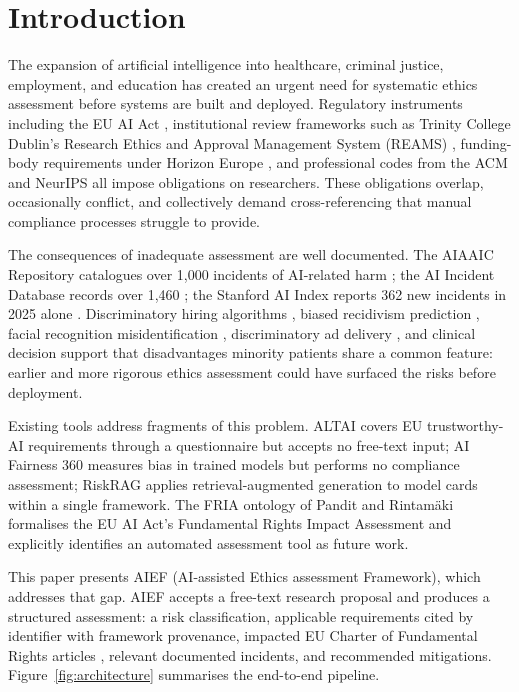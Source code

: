 \documentclass[a4paper,oneside,12pt]{book}
\numberwithin{equation}{chapter}
\begin{document}
\chapter{Introduction}
\label{ch:introduction}

The expansion of artificial intelligence into healthcare, criminal justice, employment, and education has created an urgent need for systematic ethics assessment before systems are built and deployed. Regulatory instruments including the EU AI Act \cite{euaiact2024}, institutional review frameworks such as Trinity College Dublin's Research Ethics and Approval Management System (REAMS) \cite{reams2023}, funding-body requirements under Horizon Europe \cite{horizonethics2021}, and professional codes from the ACM \cite{acmethics2018} and NeurIPS \cite{neurips2021} all impose obligations on researchers. These obligations overlap, occasionally conflict, and collectively demand cross-referencing that manual compliance processes struggle to provide.

The consequences of inadequate assessment are well documented. The AIAAIC Repository catalogues over 1,000 incidents of AI-related harm \cite{aiaaic2024}; the AI Incident Database records over 1,460 \cite{aiid2024}; the Stanford AI Index reports 362 new incidents in 2025 alone \cite{stanfordaiindex2026}. Discriminatory hiring algorithms \cite{amazonhiring2018}, biased recidivism prediction \cite{compas2016}, facial recognition misidentification \cite{rekognition2019}, discriminatory ad delivery \cite{facebookads2019}, and clinical decision support that disadvantages minority patients \cite{optum2019} share a common feature: earlier and more rigorous ethics assessment could have surfaced the risks before deployment.

Existing tools address fragments of this problem. ALTAI \cite{altai2020} covers EU trustworthy-AI requirements through a questionnaire but accepts no free-text input; AI Fairness 360 \cite{aif360} measures bias in trained models but performs no compliance assessment; RiskRAG \cite{riskrag2025} applies retrieval-augmented generation to model cards within a single framework. The FRIA ontology of Pandit and Rintam\"{a}ki \cite{pandit2024fria} formalises the EU AI Act's Fundamental Rights Impact Assessment and explicitly identifies an automated assessment tool as future work.

This paper presents AIEF (AI-assisted Ethics assessment Framework), which addresses that gap. AIEF accepts a free-text research proposal and produces a structured assessment: a risk classification, applicable requirements cited by identifier with framework provenance, impacted EU Charter of Fundamental Rights articles \cite{eucharter2012}, relevant documented incidents, and recommended mitigations. Figure~\ref{fig:architecture} summarises the end-to-end pipeline.
\end{document}
